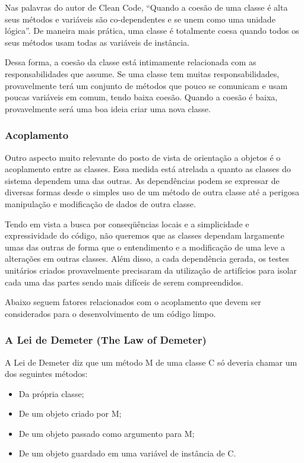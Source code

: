 Nas palavras do autor de Clean Code, “Quando a coesão de uma classe é alta seus métodos e variáveis são co-dependentes e se unem como uma unidade lógica”. De maneira mais prática, uma classe é totalmente coesa quando todos os seus métodos usam todas as variáveis de instância.
	
Dessa forma, a coesão da classe está intimamente relacionada com as responsabilidades que assume. Se uma classe tem muitas responsabilidades, provavelmente terá um conjunto de métodos que pouco se comunicam e usam poucas variáveis em comum, tendo baixa coesão. Quando a coesão é baixa, provavelmente será uma boa ideia criar uma nova classe.

\subsubsection{Acoplamento}
Outro aspecto muito relevante do posto de vista de orientação a objetos é o acoplamento entre as classes. Essa medida está atrelada a quanto as classes do sistema dependem uma das outras. As  dependências podem se expressar de diversas formas desde o simples uso de um método de outra classe até a perigosa manipulação e modificação de dados de outra classe.
	
Tendo em vista a busca por conseqüências locais e a simplicidade e expressividade do código, não queremos que as classes dependam largamente umas das outras de forma que o entendimento e a modificação de uma leve a alterações em outras classes. Além disso, a cada dependência gerada, os testes unitários criados provavelmente precisaram da utilização de artifícios para isolar cada uma das partes sendo mais difíceis de serem compreendidos.
	
Abaixo seguem fatores relacionados com o acoplamento que devem ser considerados para o desenvolvimento de um código limpo.

\subsubsection{A Lei de Demeter (The Law of Demeter)}
A Lei de Demeter diz que um método M de uma classe C só deveria chamar um dos seguintes métodos:

\begin{itemize}
	\item Da própria classe;
	\item De um objeto criado por M;
	\item De um objeto passado como argumento para M;
	\item De um objeto guardado em uma variável de instância de C.
\end{itemize}

